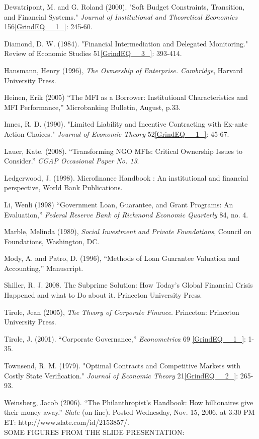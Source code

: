 \documentclass{article} %
\begin{document}
Dewatripont, M. and G. Roland (2000). "Soft Budget Constraints, Transition, and Financial Systems." \textit{Journal of Institutional and Theoretical Economics} 156\eqref{GrindEQ__1_}: 245-60. 

Diamond, D. W. (1984). "Financial Intermediation and Delegated Monitoring." Review of Economic Studies 51\eqref{GrindEQ__3_}: 393-414. 

Hansmann, Henry (1996), \textit{The Ownership of Enterprise. Cambridge}, Harvard University Press. 

Heinen, Erik (2005) ``The MFI as a Borrower: Institutional Characteristics and MFI Performance,'' Microbanking Bulletin, August, p.33. 

Innes, R. D. (1990). "Limited Liability and Incentive Contracting with Ex-ante Action Choices." \textit{Journal of Economic Theory} 52\eqref{GrindEQ__1_}: 45-67. 

Lauer, Kate. (2008). ``Transforming NGO MFIs: Critical Ownership Issues to Consider.'' \textit{CGAP Occasional Paper No. 13}. 

Ledgerwood, J. (1998). Microfinance Handbook : An institutional and financial perspective, World Bank Publications. 

Li, Wenli (1998) ``Government Loan, Guarantee, and Grant Programs: An Evaluation,'' \textit{Federal Reserve Bank of Richmond Economic Quarterly} 84, no. 4. 

Marble, Melinda (1989), \textit{Social Investment and Private Foundations}, Council on Foundations, Washington, DC. 

Mody, A. and Patro, D. (1996), ``Methods of Loan Guarantee Valuation and Accounting,'' Manuscript. 

Shiller, R. J. 2008. The Subprime Solution: How Today's Global Financial Crisis Happened and what to Do about it. Princeton University Press. 

Tirole, Jean (2005), \textit{The Theory of Corporate Finance}. Princeton: Princeton University Press. 

Tirole, J. (2001). ``Corporate Governance,'' \textit{Econometrica} 69 \eqref{GrindEQ__1_}: 1-35. 

Townsend, R. M. (1979). "Optimal Contracts and Competitive Markets with Costly State Verification." \textit{Journal of Economic Theory} 21\eqref{GrindEQ__2_}: 265-93. 

Weinsberg, Jacob (2006). ``The Philanthropist's Handbook: How billionaires give their money away.'' \textit{Slate} (on-line). Posted Wednesday, Nov. 15, 2006, at 3:30 PM ET: http://www.slate.com/id/2153857/. 
\[\mathrm{\qquad }\mathrm{\qquad }\] 
\eject SOME FIGURES FROM THE SLIDE PRESENTATION:
\end{document}
